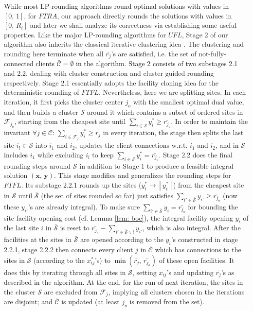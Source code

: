 \documentclass[10pt]{llncs}
\begin{document}
While most LP-rounding algorithms round optimal solutions with values
in $\left[0,\,1\right]$, for $FTRA$, our approach directly rounds
the solutions with values in $\left[0,\, R_{i}\right]$ and later
we shall analyze its correctness via establishing some useful properties.
Like the major LP-rounding algorithms \cite{Sviridenko02improved1.58,jaroslaw2010optimal,jaroslaw2012lp,Li2011}
for $UFL$, Stage 2 of our algorithm also inherits the classical iterative
clustering idea \cite{Shmoys97FL,Chudak0312e}. The clustering and
rounding here terminate when all $\bar{r_{j}}$'s are satisfied, i.e.
the set of not-fully-connected clients $\bar{\mathcal{C}}=\emptyset$
in the algorithm. Stage 2 consists of two substages 2.1 and 2.2, dealing
with cluster construction and cluster guided rounding respectively.
Stage 2.1 essentially adopts the facility cloning idea \cite{Swamy08FTFL2.076}
for the deterministic rounding of $FTFL$. Nevertheless, here we are
splitting sites. In each iteration, it first picks the cluster center
$j_{o}$ with the smallest optimal dual value, and then builds a cluster
$\mathcal{S}$ around it which contains a subset of ordered sites
in $\mathcal{F}_{j_{o}}$, starting from the cheapest site until $\sum_{i\in\mathcal{S}}y_{i}^{*}\geq\bar{r_{j_{o}}}$.
In order to maintain the invariant $\forall j\in\bar{\mathcal{C}}:\,\sum_{i\in\mathcal{F}_{j}}y_{i}^{*}\geq\bar{r_{j}}$
in every iteration, the stage then splits the last site $i_{l}\in\mathcal{S}$
into $i_{1}$ and $i_{2}$, updates the client connections w.r.t.
$i_{1}$ and $i_{2}$, and in $\mathcal{S}$ includes $i_{1}$ while
excluding $i_{l}$ to keep $\sum_{i\in\mathcal{S}}y_{i}^{*}=\bar{r_{j_{o}}}$.
Stage 2.2 does the final rounding steps around $\mathcal{S}$ in addition
to Stage 1 to produce a feasible integral solution $\left(\boldsymbol{x},\,\boldsymbol{y}\right)$.
This stage modifies and generalizes the rounding steps for $FTFL$.
Its substage 2.2.1 rounds up the sites ($y_{i}^{*}\rightarrow\left\lceil y_{i}^{*}\right\rceil $)
from the cheapest site in $\mathcal{S}$ until $\bar{\mathcal{S}}$
(the set of sites rounded so far) just satisfies \textbf{$\sum_{i'\in\bar{\mathcal{S}}}y_{i'}\geq\bar{r_{j_{o}}}$}
(now these $y_{i'}$'s are already integral). To make sure $\sum_{i'\in\bar{\mathcal{S}}}y_{i}=\bar{r_{j_{o}}}$
for bounding the site facility opening cost (cf. Lemma \ref{lem: boc}),
the integral facility opening $y_{i}$ of the last site $i$ in $\bar{\mathcal{S}}$
is reset to $\bar{r_{j_{o}}}-\sum_{i'\in\bar{\mathcal{S}}\backslash i}y_{i'}$,
which is also integral. After the facilities at the sites in $\bar{\mathcal{S}}$
are opened according to the $y_{i}$'s constructed in stage 2.2.1,
stage 2.2.2 then connects every client $j$ in $\bar{\mathcal{C}}$
which has connections to the sites in $\mathcal{S}$ (according to
the $x_{ij}^{*}$'s) to $\min\left(\bar{r_{j}},\,\bar{r_{j_{o}}}\right)$
of these open facilities. It does this by iterating through all sites
in $\bar{\mathcal{S}}$, setting $x_{ij}$'s and updating $\bar{r_{j}}$'s
as described in the algorithm. At the end, for the run of next iteration,
the sites in the cluster $\mathcal{S}$ are excluded from $\mathcal{F}_{j}$,
implying all clusters chosen in the iterations are disjoint; and $\bar{\mathcal{C}}$
is updated (at least $j_{o}$ is removed from the set). 
\end{document}
